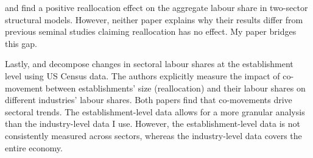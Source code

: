 



\citet{bridgmanLaborShareMarkups2023} and \citet{feijomoreiraDeclineLaborShare2022} find a positive reallocation effect on the aggregate labour share in two-sector structural models. However, neither paper explains why their results differ from previous seminal studies claiming reallocation has no effect. My paper bridges this gap.

Lastly, \citet{autorFallLaborShare2020} and \citet{kehrigMicroLevelAnatomyLabor2021a} decompose changes in sectoral labour shares at the establishment level using US Census data. The authors explicitly measure the impact of co-movement between establishments' size (reallocation) and their labour shares on different industries' labour shares. Both papers find that co-movements drive sectoral trends. The establishment-level data allows for a more granular analysis than the industry-level data I use. However, the establishment-level data is not consistently measured across sectors, whereas the industry-level data covers the entire economy. 








